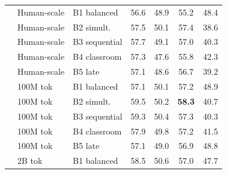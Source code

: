 \begin{table}[t]
\begin{minipage}[t]{0.49\linewidth}
\begin{tabular}{ll l cccc}
 & Human-scale & B1 balanced & \cellcolor[rgb]{0.931,1.000,0.931} 56.6 & \cellcolor[rgb]{1.000,0.989,0.989} 48.9 & \cellcolor[rgb]{0.931,1.000,0.931} 55.2 & \cellcolor[rgb]{1.000,0.982,0.982} 48.4 \\
 & Human-scale & B2 simult. & \cellcolor[rgb]{0.922,1.000,0.922} 57.5 & \cellcolor[rgb]{0.999,1.000,0.999} 50.1 & \cellcolor[rgb]{0.902,1.000,0.902} 57.4 & \cellcolor[rgb]{1.000,0.874,0.874} 38.6 \\
 & Human-scale & B3 sequential & \cellcolor[rgb]{0.920,1.000,0.920} 57.7 & \cellcolor[rgb]{1.000,0.991,0.991} 49.1 & \cellcolor[rgb]{0.907,1.000,0.907} 57.0 & \cellcolor[rgb]{1.000,0.893,0.893} 40.3 \\
 & Human-scale & B4 classroom & \cellcolor[rgb]{0.924,1.000,0.924} 57.3 & \cellcolor[rgb]{1.000,0.977,0.977} 47.6 & \cellcolor[rgb]{0.923,1.000,0.923} 55.8 & \cellcolor[rgb]{1.000,0.915,0.915} 42.3 \\
 & Human-scale & B5 late & \cellcolor[rgb]{0.926,1.000,0.926} 57.1 & \cellcolor[rgb]{1.000,0.987,0.987} 48.6 & \cellcolor[rgb]{0.911,1.000,0.911} 56.7 & \cellcolor[rgb]{1.000,0.881,0.881} 39.2 \\
\addlinespace[1.5pt]
 & 100M tok & B1 balanced & \cellcolor[rgb]{0.926,1.000,0.926} 57.1 & \cellcolor[rgb]{0.999,1.000,0.999} 50.1 & \cellcolor[rgb]{0.905,1.000,0.905} 57.2 & \cellcolor[rgb]{1.000,0.988,0.988} 48.9 \\
 & 100M tok & B2 simult. & \cellcolor[rgb]{0.901,1.000,0.901} 59.5 & \cellcolor[rgb]{0.997,1.000,0.997} 50.2 & \cellcolor[rgb]{0.890,1.000,0.890} \textbf{58.3} & \cellcolor[rgb]{1.000,0.898,0.898} 40.7 \\
 & 100M tok & B3 sequential & \cellcolor[rgb]{0.903,1.000,0.903} 59.3 & \cellcolor[rgb]{0.995,1.000,0.995} 50.4 & \cellcolor[rgb]{0.903,1.000,0.903} 57.3 & \cellcolor[rgb]{1.000,0.893,0.893} 40.3 \\
 & 100M tok & B4 classroom & \cellcolor[rgb]{0.918,1.000,0.918} 57.9 & \cellcolor[rgb]{1.000,0.998,0.998} 49.8 & \cellcolor[rgb]{0.905,1.000,0.905} 57.2 & \cellcolor[rgb]{1.000,0.906,0.906} 41.5 \\
 & 100M tok & B5 late & \cellcolor[rgb]{0.926,1.000,0.926} 57.1 & \cellcolor[rgb]{1.000,0.990,0.990} 49.0 & \cellcolor[rgb]{0.909,1.000,0.909} 56.9 & \cellcolor[rgb]{1.000,0.987,0.987} 48.8 \\
\addlinespace[1.5pt]
 & 2B tok & B1 balanced & \cellcolor[rgb]{0.911,1.000,0.911} 58.5 & \cellcolor[rgb]{0.992,1.000,0.992} 50.6 & \cellcolor[rgb]{0.907,1.000,0.907} 57.0 & \cellcolor[rgb]{1.000,0.975,0.975} 47.7 \\

\end{tabular}
\end{minipage}
\end{table}

